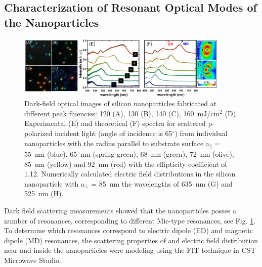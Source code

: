     \subsection{Characterization of Resonant Optical Modes of the Nanoparticles}
        \label{sec:DarkfieldExp}

        \begin{figure}[!ht]
                \begin{center}
                    \includegraphics[width=0.9\textwidth]{figs/results/char/DarkField.eps}
                \end{center}
                \caption{Dark-field optical images of silicon nanoparticles fabricated at different peak fluencies:
                120 (A), 130 (B), 140 (C), 160~mJ/cm$^{2}$ (D). Experimental (E) and theoretical (F) spectra for
                scattered p-polarized incident light (angle of incidence is 65$^{\circ}$) from individual nanoparticles
                with the radius parallel to substrate surface a$_{\parallel}$ = 55~nm (blue), 65~nm (spring green),
                68~nm (green), 72~nm (olive), 85~nm (yellow) and 92~nm (red) with the ellipticity coefficient of 1.12.
                Numerically calculated electric field distributions in the silicon nanoparticle with a$_{\perp}$ = 85~nm
                 the wavelengths of 635~nm (G) and 525~nm (H).}
                \label{fig:Darkfield}
        \end{figure}

            Dark field scattering measurements showed that the nanoparticles posses a number of resonances, corresponding to different
        Mie-type resonances, see Fig. \ref{fig:Darkfield}. To determine which resonances correspond to electric dipole (ED) and
        magnetic dipole (MD) resonances, the scattering properties of and electric field distribution near and inside the nanoparticles were
        modeling using the FIT technique in CST Microwave Studio.

